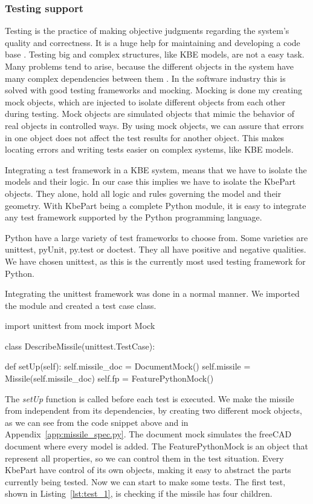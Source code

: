 \subsubsection{Testing support} %
\label{ssub:testing_support}
Testing is the practice of making objective judgments regarding the system's quality and correctness. It is a huge help for maintaining and developing a code base \citep{agile_samurai}. Testing big and complex structures, like KBE models, are not a easy task. Many problems tend to arise, because the different objects in the system have many complex dependencies between them \citep{aunit}. In the software industry this is solved with good testing frameworks and mocking. Mocking is done my creating mock objects, which are injected to isolate different objects from each other during testing. Mock objects are simulated objects that mimic the behavior of real objects in controlled ways. By using mock objects, we can assure that errors in one object does not affect the test results for another object. This makes locating errors and writing tests easier on complex systems, like KBE models.

Integrating a test framework in a KBE system, means that we have to isolate the models and their logic. In our case this implies we have to isolate the KbePart objects. They alone, hold all logic and rules governing the model and their geometry. With KbePart being a complete Python module, it is easy to integrate any test framework supported by the Python programming language.

Python have a large variety of test frameworks to choose from. Some varieties are unittest, pyUnit, py.test or doctest. They all have positive and negative qualities. We have chosen unittest, as this is the currently most used testing framework for Python.

Integrating the unittest framework was done in a normal manner. We imported the module and created a test case class.

\begin{python}[caption={Creating a TestCase},label={lst:test_case}]
  import unittest
  from mock import Mock

  class DescribeMissile(unittest.TestCase):

    def setUp(self):
        self.missile_doc = DocumentMock()
        self.missile = Missile(self.missile_doc)
        self.fp = FeaturePythonMock()
\end{python}

The \textit{setUp} function is called before each test is executed. We make the missile from independent from its dependencies, by creating two different mock objects, as we can see from the code snippet above and in Appendix~\ref{app:missile_spec.py}. The document mock simulates the freeCAD document where every model is added. The FeaturePythonMock is an object that represent all properties, so we can control them in the test situation. Every KbePart have control of its own objects, making it easy to abstract the parts currently being tested. Now we can start to make some tests. The first test, shown in Listing~\ref{lst:test_1}, is checking if the missile has four children.

